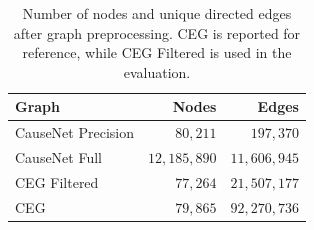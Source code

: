 \begin{table}[t]
  \centering
  \small
  \begin{tabular}{@{}p{9.65cm}rr@{}}
    \toprule
    \textbf{Graph} & \textbf{Nodes} & \textbf{Edges} \\
    \midrule
    CauseNet Precision & $80{,}211$ & $197{,}370$ \\
    CauseNet Full & $12{,}185{,}890$ & $11{,}606{,}945$ \\
    CEG Filtered & $77{,}264$ & $21{,}507{,}177$ \\
    CEG & $79{,}865$ & $92{,}270{,}736$ \\
    \bottomrule
  \end{tabular}
  \caption{Number of nodes and unique directed edges after graph preprocessing. CEG is reported for reference, while CEG Filtered is used in the evaluation.}
  \label{tab:graph-statistics}
\end{table}
